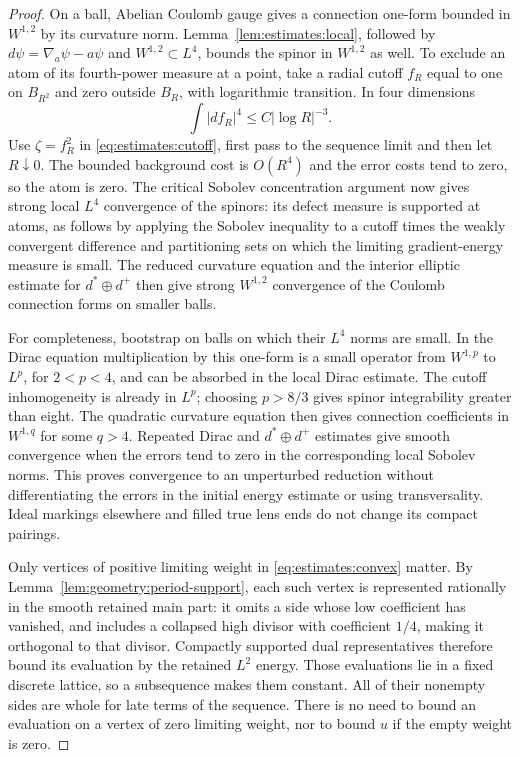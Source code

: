 \begin{proof}
On a ball, Abelian Coulomb gauge gives a
connection one-form bounded in $W^{1,2}$ by its curvature norm.
Lemma~\ref{lem:estimates:local}, followed by
$d\psi=\nabla_a\psi-a\psi$ and $W^{1,2}\subset L^4$, bounds the
spinor in $W^{1,2}$ as well.  To exclude an atom of its fourth-power
measure at a point, take a radial cutoff $f_R$ equal to one on
$B_{R^2}$ and zero outside $B_R$, with logarithmic transition.
In four dimensions
\[
          \int|df_R|^4\leq C|\log R|^{-3}.
\]
Use $\zeta=f_R^2$ in \eqref{eq:estimates:cutoff}, first pass to the
sequence limit and then let $R\downarrow0$.  The bounded background
cost is $O(R^4)$ and the error costs tend to zero, so the atom is
zero.  The critical Sobolev concentration argument now gives strong
local $L^4$ convergence of the spinors: its defect measure is
supported at atoms, as follows by applying the Sobolev inequality
to a cutoff times the weakly convergent difference and partitioning
sets on which the limiting gradient-energy measure is small.
The reduced curvature equation and the interior elliptic estimate
for $d^*\oplus d^+$ then give strong $W^{1,2}$ convergence of the
Coulomb connection forms on smaller balls.

For completeness, bootstrap on balls on which their $L^4$ norms
are small.  In the Dirac equation multiplication by this one-form
is a small operator from $W^{1,p}$ to $L^p$, for $2<p<4$, and can
be absorbed in the local Dirac estimate.  The cutoff inhomogeneity
is already in $L^p$; choosing $p>8/3$ gives spinor integrability
greater than eight.  The quadratic curvature equation then gives
connection coefficients in $W^{1,q}$ for some $q>4$.  Repeated
Dirac and $d^*\oplus d^+$ estimates give smooth convergence when
the errors tend to zero in the corresponding local Sobolev norms.
This proves convergence to an unperturbed reduction without
differentiating the errors in the initial energy estimate or using
transversality.  Ideal markings elsewhere and filled true lens ends
do not change its compact pairings.

Only vertices of positive limiting
weight in \eqref{eq:estimates:convex} matter.  By
Lemma~\ref{lem:geometry:period-support}, each such vertex is
represented rationally in the smooth retained main part: it omits
a side whose low coefficient has vanished, and includes a collapsed
high divisor with coefficient $1/4$, making it orthogonal to that
divisor.  Compactly supported dual representatives therefore bound
its evaluation by the retained $L^2$ energy.  Those evaluations lie
in a fixed discrete lattice, so a subsequence makes them constant.
All of their nonempty sides are whole for late terms of the
sequence.  There is no need to bound an evaluation on a vertex of
zero limiting weight, nor to bound $u$ if the empty weight is zero.


\end{proof}
